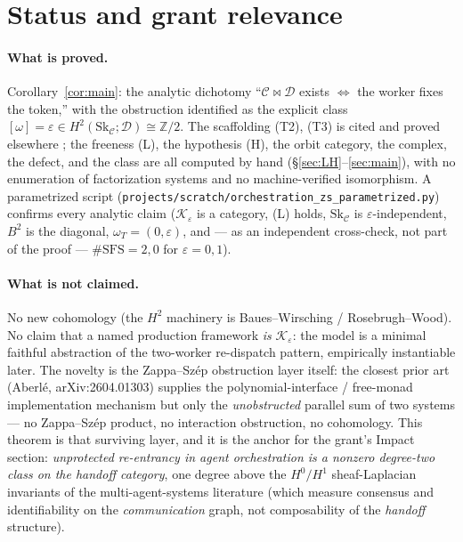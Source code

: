 \documentclass[11pt]{article}
\theoremstyle{definition}
\newcommand{\C}{\mathcal{C}}
\newcommand{\D}{\mathcal{D}}
\newcommand{\K}{\mathcal{K}}
\newcommand{\Sk}{\mathrm{Sk}}
\begin{document}
\section{Status and grant relevance}\label{sec:grant}

\paragraph{What is proved.} Corollary~\ref{cor:main}: the analytic dichotomy
``$\C\bowtie\D$ exists $\iff$ the worker fixes the token,'' with the obstruction
identified as the explicit class $[\omega]=\varepsilon\in H^2(\Sk_\C;\D)\cong
\mathbb Z/2$. The scaffolding (T2), (T3) is cited and proved elsewhere
\cite{pairwise,gobstr,rw,bw}; the freeness (L), the hypothesis (H), the orbit
category, the complex, the defect, and the class are all computed by hand
(\S\ref{sec:LH}--\ref{sec:main}), with no enumeration of factorization systems and
no machine-verified isomorphism. A parametrized script
(\texttt{projects/scratch/orchestration\_zs\_parametrized.py}) confirms every
analytic claim ($\K_\varepsilon$ is a category, (L) holds, $\Sk_\C$ is
$\varepsilon$-independent, $B^2$ is the diagonal, $\omega_T=(0,\varepsilon)$, and
--- as an independent cross-check, not part of the proof --- $\#\mathrm{SFS}=2,0$ for
$\varepsilon=0,1$).

\paragraph{What is not claimed.} No new cohomology (the $H^2$ machinery is
Baues--Wirsching / Rosebrugh--Wood). No claim that a named production framework
\emph{is} $\K_\varepsilon$: the model is a minimal faithful abstraction of the
two-worker re-dispatch pattern, empirically instantiable later. The novelty is the
Zappa--Sz\'ep obstruction layer itself: the closest prior art (Aberl\'e,
arXiv:2604.01303) supplies the polynomial-interface / free-monad implementation
mechanism but only the \emph{unobstructed} parallel sum of two systems --- no
Zappa--Sz\'ep product, no interaction obstruction, no cohomology. This theorem is
that surviving layer, and it is the anchor for the grant's Impact section:
\emph{unprotected re-entrancy in agent orchestration is a nonzero degree-two class
on the handoff category}, one degree above the $H^0/H^1$ sheaf-Laplacian invariants
of the multi-agent-systems literature (which measure consensus and identifiability on
the \emph{communication} graph, not composability of the \emph{handoff} structure).
\end{document}
